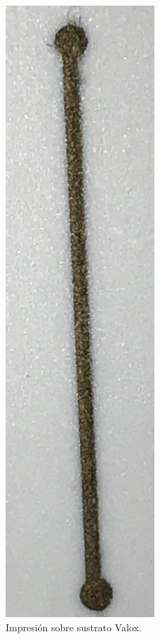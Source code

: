 \begin{figure}[H]
  \centering
    \includegraphics[width=0.5\textwidth]{Figuras/Figura_impresion_sustrato_valox_tinta_Oro}
  \caption{Impresión sobre sustrato Valox.}
  \label{fig:Figura_impresion_sustrato_valox_tinta_Oro}
\end{figure}

